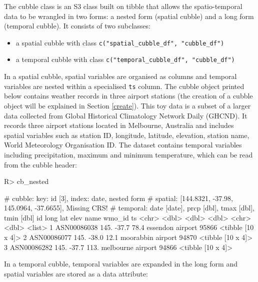 \documentclass[
  shortnames]{jss}
\providecommand{\tightlist}{%
  \setlength{\itemsep}{0pt}\setlength{\parskip}{0pt}}
\begin{document}
The cubble class is an S3 class built on tibble that allows the spatio-temporal data to be wrangled in two forms: a nested form (spatial cubble) and a long form (temporal cubble). It consists of two subclasses:

\begin{itemize}
\tightlist
\item
  a spatial cubble with class \texttt{c("spatial\_cubble\_df",\ "cubble\_df")}
\item
  a temporal cubble with class \texttt{c("temporal\_cubble\_df",\ "cubble\_df")}
\end{itemize}

In a spatial cubble, spatial variables are organised as columns and temporal variables are nested within a specialised \texttt{ts} column. The cubble object printed below contains weather records in three airport stations (the creation of a cubble object will be explained in Section \ref{create}). This toy data is a subset of a larger data  collected from Global Historical Climatology Network Daily (GHCND). It records three airport stations located in Melbourne, Australia and includes spatial variables such as station ID, longitude, latitude, elevation, station name, World Meteorology Organisation ID. The dataset contains temporal variables including precipitation, maximum and minimum temperature, which can be read from the cubble header:

\begin{CodeChunk}
\begin{CodeInput}
R> cb_nested
\end{CodeInput}
\begin{CodeOutput}
# cubble:   key: id [3], index: date, nested form
# spatial:  [144.8321, -37.98, 145.0964, -37.6655], Missing CRS!
# temporal: date [date], prcp [dbl], tmax [dbl], tmin [dbl]
  id           long   lat  elev name              wmo_id ts               
  <chr>       <dbl> <dbl> <dbl> <chr>              <dbl> <list>           
1 ASN00086038  145. -37.7  78.4 essendon airport   95866 <tibble [10 x 4]>
2 ASN00086077  145. -38.0  12.1 moorabbin airport  94870 <tibble [10 x 4]>
3 ASN00086282  145. -37.7 113.  melbourne airport  94866 <tibble [10 x 4]>
\end{CodeOutput}
\end{CodeChunk}

In a temporal cubble, temporal variables are expanded in the long form and spatial variables are stored as a data attribute:
\end{document}
